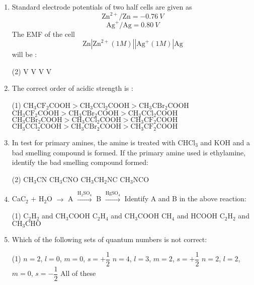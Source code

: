 \documentclass[twocolumn]{article}
\renewcommand{\frac}[2]{\dfrac{#1}{#2}}
\begin{document}
\begin{enumerate}
    \item Standard electrode potentials of two half cells are given as
    \[\text{Zn}^{2+}/\text{Zn} = -0.76\ V\]
    \[\text{Ag}^+/\text{Ag} = 0.80\ V\]
    The EMF of the cell
    \[\text{Zn}|\text{Zn}^{2+} (1M) || \text{Ag}^+ (1M) | \text{Ag}\]
    will be :
    \begin{tasks}(2)
         V
         V
         V
         V
    \end{tasks}

    \item The correct order of acidic strength is :
    \begin{tasks}(1)
        \task \( \mathrm{CH_3CF_2COOH > CH_3CCl_2COOH > CH_3CBr_2COOH} \)
        \task \( \mathrm{CH_3CF_2COOH > CH_3CBr_2COOH > CH_3CCl_2COOH} \)
        \task \( \mathrm{CH_3CBr_2COOH > CH_3CCl_2COOH > CH_3CF_2COOH} \)
        \task \( \mathrm{CH_3CCl_2COOH > CH_3CBr_2COOH > CH_3CF_2COOH} \)
    \end{tasks}
    
    \item In test for primary amines, the amine is treated with CHCl\(_3\) and KOH and a bad smelling compound is formed. If the primary amine used is ethylamine, identify the bad smelling compound formed:
    \begin{tasks}(2)
        \task \( \mathrm{CH_3CN} \)
        \task \( \mathrm{CH_3CNO} \)
        \task \( \mathrm{CH_3CH_2NC} \)
        \task \( \mathrm{CH_3NCO} \)
    \end{tasks}
    
    \item CaC\(_2\) + H\(_2\)O \(\rightarrow\) A \( \overset{\mathrm{H_2SO_4}}{\rightarrow} \) B \( \overset{\mathrm{HgSO_4}}{\rightarrow} \)
    Identify A and B in the above reaction:
    \begin{tasks}(1)
        \task \( \mathrm{C_2H_2} \) and \( \mathrm{CH_3COOH} \)
        \task \( \mathrm{C_2H_4} \) and \( \mathrm{CH_3COOH} \)
        \task \( \mathrm{CH_4} \) and \( \mathrm{HCOOH} \)
        \task \( \mathrm{C_2H_2} \) and \( \mathrm{CH_3CHO} \)
    \end{tasks}

    \item Which of the following sets of quantum numbers is not correct:
    \begin{tasks}(1)
        \task \( n = 2 \), \( l = 0 \), \( m = 0 \), \( s = +\frac{1}{2} \)
        \task \( n = 4 \), \( l = 3 \), \( m = 2 \), \( s = +\frac{1}{2} \)
        \task \( n = 2 \), \( l = 2 \), \( m = 0 \), \( s = -\frac{1}{2} \)
        \task All of these
    \end{tasks}
    

\end{enumerate}
\end{document}
